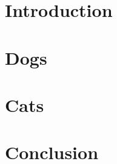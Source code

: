 \chapter{Introduction}
\label{c:intro}

%
\chapter{Dogs}
\label{c:nuAstro}

%
\chapter{Cats}
\label{c:anita}

%
\chapter{Conclusion}
\label{c:concl}


